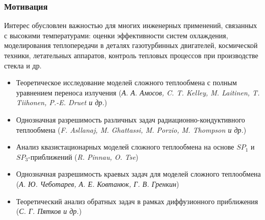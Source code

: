 \begin{frame}
    \setcounter{framenumber}{1}
    \maketitle
\end{frame}


\begin{frame}
    \frametitle{Мотивация}
    Интерес обусловлен важностью для многих
    инженерных применений, связанных с высокими температурами: оценки
    эффективности систем охлаждения, моделирования теплопередачи в деталях
    газотурбинных двигателей, космической техники, летательных аппаратов,
    контроль тепловых процессов при производстве стекла и др.

    \hfill
    \hfill
    \begin{itemize}
        \item Теоретическое исследование моделей сложного теплообмена с
        полным уравнением переноса излучения
        (\textit{А. А. Амосов, C. T. Kelley, M. Laitinen, T. Tiihonen, P.-E. Druet и др.})
        \item Однозначная разрешимость различных задач радиационно-кондуктивного теплообмена
        (\textit{F. Asllanaj, M. Ghattassi, M. Porzio, M. Thompson и др.})
        \item Анализ квазистационарных моделей сложного теплообмена на основе $SP_1$ и $SP_3$-приближений
        (\textit{R. Pinnau, O. Tse})
        \item Однозначная разрешимость краевых задач для моделей сложного теплообмена
        (\textit{А. Ю. Чеботарев, А. Е. Ковтанюк, Г. В. Гренкин})
        \item Теоретический анализ обратных задач в рамках диффузионного приближения
        (\textit{С. Г. Пятков и др.})
    \end{itemize}
\end{frame}

